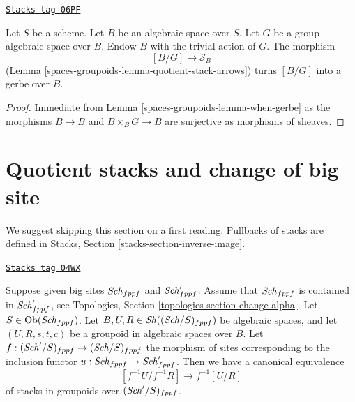 \begin{lemma}
\label{spaces-groupoids-lemma-group-quotient-gerbe}
\href{https://stacks.math.columbia.edu/tag/06PF}{\texttt{Stacks tag 06PF}}

Let $S$ be a scheme. Let $B$ be an algebraic space over $S$. Let
$G$ be a group algebraic space over $B$. Endow $B$ with the trivial
action of $G$. The morphism
$$
[B/G] \longrightarrow \mathcal{S}_B
$$
(Lemma \ref{spaces-groupoids-lemma-quotient-stack-arrows})
turns $[B/G]$ into a gerbe over $B$.
\end{lemma}

\begin{proof}
Immediate from
Lemma \ref{spaces-groupoids-lemma-when-gerbe}
as the morphisms $B \to B$ and $B \times_B G \to B$ are surjective
as morphisms of sheaves.
\end{proof}

\section{Quotient stacks and change of big site}
\label{spaces-groupoids-section-bigger-site}
We suggest skipping this section on a first reading.
Pullbacks of stacks are defined in
Stacks, Section \ref{stacks-section-inverse-image}.

\begin{lemma}
\label{spaces-groupoids-lemma-quotient-stack-change-big-site}
\href{https://stacks.math.columbia.edu/tag/04WX}{\texttt{Stacks tag 04WX}}

Suppose given big sites $\mathit{Sch}_{fppf}$ and $\mathit{Sch}'_{fppf}$.
Assume that $\mathit{Sch}_{fppf}$ is contained in $\mathit{Sch}'_{fppf}$,
see Topologies, Section \ref{topologies-section-change-alpha}.
Let $S \in \operatorname{Ob}(\mathit{Sch}_{fppf})$.
Let $B, U, R \in \mathit{Sh}((\mathit{Sch}/S)_{fppf})$ be algebraic spaces,
and let $(U, R, s, t, c)$ be a groupoid in algebraic spaces over $B$.
Let $f : (\mathit{Sch}'/S)_{fppf} \to (\mathit{Sch}/S)_{fppf}$ the morphism
of sites corresponding to the inclusion functor
$u : \mathit{Sch}_{fppf} \to \mathit{Sch}'_{fppf}$.
Then we have a canonical equivalence
$$
[f^{-1}U/f^{-1}R]
\longrightarrow
f^{-1}[U/R]
$$
of stacks in groupoids over $(\mathit{Sch}'/S)_{fppf}$.
\end{lemma}

